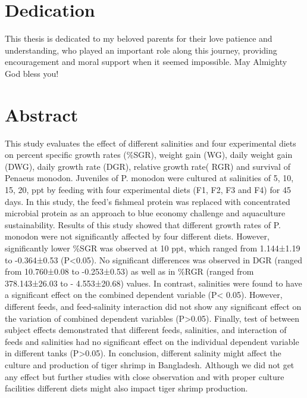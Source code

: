 \documentclass[
]{book}
\begin{document}
\hypertarget{dedication}{%
\chapter*{Dedication}\label{dedication}}

This thesis is dedicated to my beloved parents for their love patience and understanding, who played an important role along this journey, providing encouragement and moral support when it seemed impossible. May Almighty God bless you!

\hypertarget{abstract}{%
\chapter*{Abstract}\label{abstract}}

This study evaluates the effect of different salinities and four experimental diets on percent
specific growth rates (\%SGR), weight gain (WG), daily weight gain (DWG), daily growth rate
(DGR), relative growth rate( RGR) and survival of Penaeus monodon. Juveniles of P. monodon
were cultured at salinities of 5, 10, 15, 20, ppt by feeding with four experimental diets (F1, F2, F3
and F4) for 45 days. In this study, the feed's fishmeal protein was replaced with concentrated
microbial protein as an approach to blue economy challenge and aquaculture sustainability. Results
of this study showed that different growth rates of P. monodon were not significantly affected by
four different diets. However, significantly lower \%SGR was observed at 10 ppt, which ranged
from 1.144±1.19 to -0.364±0.53 (P\textless0.05). No significant differences was observed in DGR
(ranged from 10.760±0.08 to -0.253±0.53) as well as in \%RGR (ranged from 378.143±26.03 to -
4.553±20.68) values. In contrast, salinities were found to have a significant effect on the combined
dependent variable (P\textless{} 0.05). However, different feeds, and feed-salinity interaction did not show
any significant effect on the variation of combined dependent variables (P\textgreater0.05). Finally, test of
between subject effects demonstrated that different feeds, salinities, and interaction of feeds and
salinities had no significant effect on the individual dependent variable in different tanks (P\textgreater0.05).
In conclusion, different salinity might affect the culture and production of tiger shrimp in
Bangladesh. Although we did not get any effect but further studies with close observation and with
proper culture facilities different diets might also impact tiger shrimp production.
\end{document}
